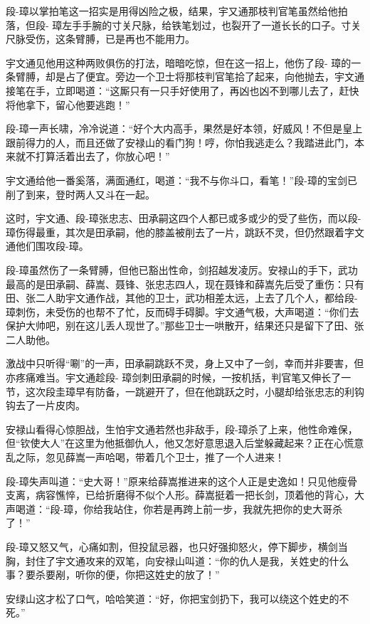 \documentclass[12pt,oneside]{book}
\begin{document}
段-璋以掌拍笔这一招实是用得凶险之极，结果，宇又通那枝判官笔虽然给他拍落，但段-
璋左手手腕的寸关尺脉，给铁笔划过，也裂开了一道长长的口子。寸关尺脉受伤，这条臂膊，已是再也不能用力。

宇文通见他用这种两败俱伤的打法，暗暗吃惊，但在这一招上，他伤了段-
璋的一条臂膊，却是占了便宜。旁边一个卫士将那枝判官笔拾了起来，向他抛去，宇文通接笔在手，立即喝道：``这厮只有一只手好使用了，再凶也凶不到哪儿去了，赶快将他拿下，留心他要逃跑！''

段-璋一声长啸，冷冷说道：``好个大内高手，果然是好本领，好威风！不但是皇上跟前得力的人，而且还做了安禄山的看门狗！哼，你怕我逃走么？我踏进此门，本来就不打算活着出去了，你放心吧！''

宇文通给他一番奚落，满面通红，喝道：``我不与你斗口，看笔！''段-璋的宝剑已削了到来，登时两人又斗在一起。

这时，宇文通、段-璋张忠志、田承嗣这四个人都已或多或少的受了些伤，而以段-
璋伤得最重，其次是田承嗣，他的膝盖被削去了一片，跳跃不灵，但仍然跟着字文通他们围攻段-璋。

段-璋虽然伤了一条臂膊，但他已豁出性命，剑招越发凌厉。安禄山的手下，武功最高的是田承嗣、薛嵩、聂锋、张忠志四人，现在聂锋和薛嵩先后受了重伤：只有田、张二人助宇文通作战，其他的卫士，武功相差太远，上去了几个人，都给段-
璋刺伤，未受伤的也帮不了忙，反而碍手碍脚。宇文通气极，大声喝道：``你们去保护大帅吧，别在这儿丢人现世了。''那些卫士一哄散开，结果还只是留下了田、张二人助他。

激战中只听得``唰''的一声，田承嗣跳跃不灵，身上又中了一剑，幸而并非要害，但亦疼痛难当。宇文通趁段-
璋剑刺田承嗣的时候，一按机括，判官笔又伸长了一节，这次段圭璋早有防备，一跳避开了，但在他跳跃之时，小腿却给张忠志的利钩钩去了一片皮肉。

安禄山看得心惊胆战，生怕宇文通若然也非敌手，段-璋杀了上来，他性命难保，但``钦使大人''在这里为他抵御仇人，他又怎好意思退入后堂躲藏起来？正在心慌意乱之际，忽见薛嵩一声哈喝，带着几个卫士，推了一个人进来！

段-璋失声叫道：``史大哥！''原来给薛嵩推进来的这个人正是史逸如！只见他瘦骨支离，病容憔悴，已给折磨得不似个人形。薛嵩挺着一把长剑，顶着他的背心，大声喝道：``段-璋，你给我站住，你若是再跨上前一步，我就先把你的史大哥杀了！''

段-璋又怒又气，心痛如割，但投鼠忌器，也只好强抑怒火，停下脚步，横剑当胸，封住了宇文通攻来的双笔，向安禄山叫道：``你的仇人是我，关姓史的什么事？要杀要剐，听你的便，你把这姓史的放了！''

安绿山这才松了口气，哈哈笑道：``好，你把宝剑扔下，我可以绕这个姓史的不死。''
\end{document}
